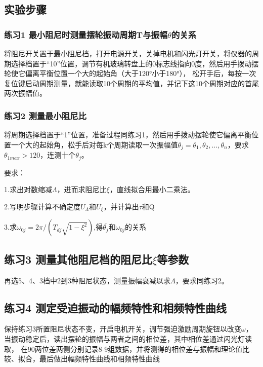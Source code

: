 \documentclass[UTF8]{ctexart}
\begin{document}
        \subsection{实验步骤}
            \subsubsection{练习1 \quad 最小阻尼时测量摆轮振动周期T与振幅$\theta$的关系}
                将阻尼开关置于最小阻尼档，打开电源开关，关掉电机和闪光灯开关，将仪器的周期选择档置于“10”位置，调节有机玻璃转盘上的0标志线指向0度，然后用手拨动摆轮使它偏离平衡位置一个大的起始角（大于120°小于180°），
                松开手后，每按一次复位键启动周期测量，就能读取10个周期的平均值，并记下这10个周期对应的首尾两次振幅值。
            \subsubsection{练习2 \quad 测量最小阻尼比}
                将周期选择档置于“1”位置，准备过程同练习1，然后用手拨动摆轮使它偏离平衡位置一个大的起始角，松手后对每k个周期读取一次振幅值$\theta_{j}=\theta_{1},\theta_{2},...,\theta_{n}$，要求$\theta_{1max}>120$，连测十个$\theta_{j}$。

                要求：
                \par{1.求出对数缩减$\Lambda$，进而求阻尼比$\xi$，直线拟合用最小二乘法。}
                \par{2.写明步骤计算不确定度$U_{\Lambda}$和$U_{\xi}$，并计算出$\tau$和Q}
                \par{3.求$\omega_{0j}=2\pi/(T_{dj}\sqrt{1-\xi^{2}})$,得$\bar{\theta_{j}}$和$\omega_{0j}$的关系}
            \subsection{练习3 \quad 测量其他阻尼档的阻尼比$\xi$等参数}
                再选5、4、3档中2到3种阻尼状态，测量振幅衰减以求$\Lambda$，要求同练习2。
            \subsection{练习4 \quad 测定受迫振动的幅频特性和相频特性曲线}
                保持练习3所置阻尼状态不变，开启电机开关，调节强迫激励周期旋钮以改变$\omega$，当振动稳定后，读出摆轮的振幅与两者之间的相位差，其中相位差通过闪光灯读取，
                在90两位差两侧分别记录8-9组数据，并将测得的相位差与振幅和理论值比较、拟合，最后做出幅频特性曲线和相频特性曲线
\end{document}

